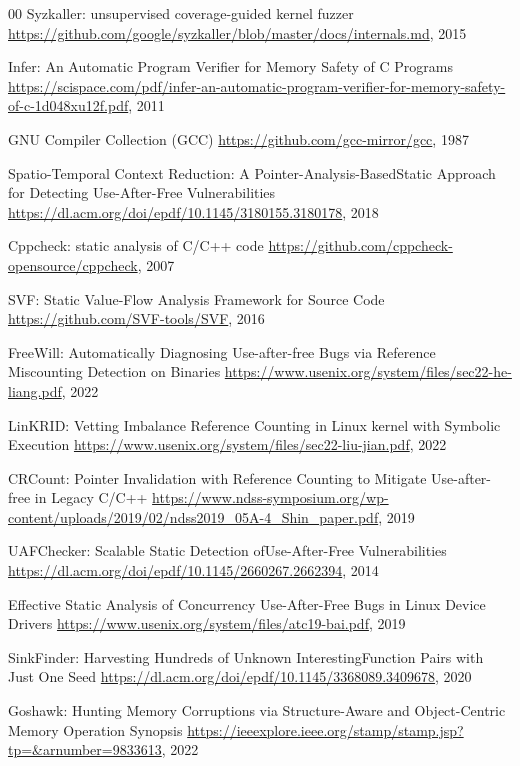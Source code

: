 \begin{thebibliography}{00}
Syzkaller: unsupervised coverage-guided kernel fuzzer
\url{https://github.com/google/syzkaller/blob/master/docs/internals.md}, 2015

Infer: An Automatic Program Verifier for Memory Safety of C Programs
\url{https://scispace.com/pdf/infer-an-automatic-program-verifier-for-memory-safety-of-c-1d048xu12f.pdf}, 2011

GNU Compiler Collection (GCC)
\url{https://github.com/gcc-mirror/gcc}, 1987

Spatio-Temporal Context Reduction: A Pointer-Analysis-BasedStatic Approach for Detecting Use-After-Free Vulnerabilities
\url{https://dl.acm.org/doi/epdf/10.1145/3180155.3180178}, 2018

Cppcheck: static analysis of C/C++ code
\url{https://github.com/cppcheck-opensource/cppcheck}, 2007

SVF: Static Value-Flow Analysis Framework for Source Code
\url{https://github.com/SVF-tools/SVF}, 2016

FreeWill: Automatically Diagnosing Use-after-free Bugs
via Reference Miscounting Detection on Binaries
\url{https://www.usenix.org/system/files/sec22-he-liang.pdf}, 2022

LinKRID: Vetting Imbalance Reference Counting
in Linux kernel with Symbolic Execution
\url{https://www.usenix.org/system/files/sec22-liu-jian.pdf}, 2022

CRCount: Pointer Invalidation with Reference
Counting to Mitigate Use-after-free in Legacy C/C++
\url{https://www.ndss-symposium.org/wp-content/uploads/2019/02/ndss2019_05A-4_Shin_paper.pdf}, 2019

UAFChecker: Scalable Static Detection ofUse-After-Free Vulnerabilities
\url{https://dl.acm.org/doi/epdf/10.1145/2660267.2662394}, 2014

Effective Static Analysis of Concurrency
Use-After-Free Bugs in Linux Device Drivers
\url{https://www.usenix.org/system/files/atc19-bai.pdf}, 2019

SinkFinder: Harvesting Hundreds of Unknown InterestingFunction Pairs with Just One Seed
\url{https://dl.acm.org/doi/epdf/10.1145/3368089.3409678}, 2020

Goshawk: Hunting Memory Corruptions via
Structure-Aware and Object-Centric Memory
Operation Synopsis
\url{https://ieeexplore.ieee.org/stamp/stamp.jsp?tp=&arnumber=9833613}, 2022


\end{thebibliography}
